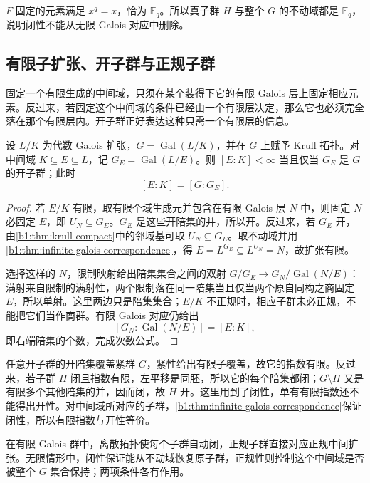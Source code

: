 \ProseParagraphBreak
\(F\) 固定的元素满足 \(x^q=x\)，恰为 \(\mathbb F_q\)。所以真子群 \(H\) 与整个 \(G\) 的不动域都是 \(\mathbb F_q\)，说明闭性不能从无限 Galois 对应中删除。

\subsection{有限子扩张、开子群与正规子群}
\label{b1:subsec:2203:03}
固定一个有限生成的中间域，只须在某个装得下它的有限 Galois 层上固定相应元素。反过来，若固定这个中间域的条件已经由一个有限层决定，那么它也必须完全落在那个有限层内。开子群正好表达这种只需一个有限层的信息。

\begin{proposition}\label{b1:prop:finite-open-correspondence}
	设 \(L/K\) 为代数 Galois 扩张，\(G=\operatorname{Gal}(L/K)\)，并在 \(G\) 上赋予 Krull 拓扑。对中间域 \(K\subseteq E\subseteq L\)，记 \(G_E=\operatorname{Gal}(L/E)\)。则 \([E:K]<\infty\) 当且仅当 \(G_E\) 是 \(G\) 的开子群；此时
	\[
		[E:K]=[G:G_E].
	\]
\end{proposition}
\begin{proof}
	若 \(E/K\) 有限，取有限个域生成元并包含在有限 Galois 层 \(N\) 中，则固定 \(N\) 必固定 \(E\)，即 \(U_N\subseteq G_E\)。\(G_E\) 是这些开陪集的并，所以开。反过来，若 \(G_E\) 开，由\cref{b1:thm:krull-compact}中的邻域基可取 \(U_N\subseteq G_E\)。取不动域并用\cref{b1:thm:infinite-galois-correspondence}，得 \(E=L^{G_E}\subseteq L^{U_N}=N\)，故扩张有限。

	选择这样的 \(N\)，限制映射给出陪集集合之间的双射 \(G/G_E\rightarrow G_N/\operatorname{Gal}(N/E)\)：满射来自限制的满射性，两个限制落在同一陪集当且仅当两个原自同构之商固定 \(E\)，所以单射。这里两边只是陪集集合；\(E/K\) 不正规时，相应子群未必正规，不能把它们当作商群。有限 Galois 对应仍给出
	\[
		[G_N:\operatorname{Gal}(N/E)]=[E:K],
	\]
	即右端陪集的个数，完成次数公式。
\end{proof}
任意开子群的开陪集覆盖紧群 \(G\)，紧性给出有限子覆盖，故它的指数有限。反过来，若子群 \(H\) 闭且指数有限，左平移是同胚，所以它的每个陪集都闭；\(G\setminus H\) 又是有限多个其他陪集的并，因而闭，故 \(H\) 开。这里用到了闭性，单有有限指数还不能得出开性。对中间域所对应的子群，\cref{b1:thm:infinite-galois-correspondence}保证闭性，所以有限指数与开性等价。

\ProseParagraphBreak
在有限 Galois 群中，离散拓扑使每个子群自动闭，正规子群直接对应正规中间扩张。无限情形中，闭性保证能从不动域恢复原子群，正规性则控制这个中间域是否被整个 \(G\) 集合保持；两项条件各有作用。

